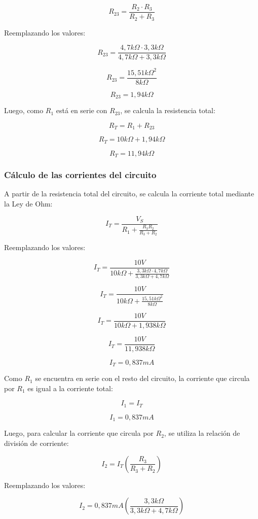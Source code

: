 \documentclass[a4paper,12pt]{article}
\begin{document}
	\[
	R_{23} = \frac{R_2 \cdot R_3}{R_2 + R_3}
	\]
	
	Reemplazando los valores:
	
	\[
	R_{23} =
	\frac{4,7k\Omega \cdot 3,3k\Omega}{4,7k\Omega + 3,3k\Omega}
	\]
	
	\[
	R_{23} =
	\frac{15,51k\Omega^2}{8k\Omega}
	\]
	
	\[
	R_{23} = 1,94k\Omega
	\]
	
	Luego, como $R_1$ está en serie con $R_{23}$, se calcula la resistencia total:
	
	\[
	R_T = R_1 + R_{23}
	\]
	
	\[
	R_T = 10k\Omega + 1,94k\Omega
	\]
	
	\[
	R_T = 11,94k\Omega
	\]
	
	
	\subsubsection*{Cálculo de las corrientes del circuito}
	
	A partir de la resistencia total del circuito, se calcula la corriente total mediante la Ley de Ohm:
	
	\[
	I_T =
	\frac{V_S}
	{R_1 + \frac{R_3 R_2}{R_3 + R_2}}
	\]
	
	Reemplazando los valores:
	
	\[
	I_T =
	\frac{10V}
	{10k\Omega + \frac{3,3k\Omega \cdot 4,7k\Omega}{3,3k\Omega + 4,7k\Omega}}
	\]
	
	\[
	I_T =
	\frac{10V}
	{10k\Omega + \frac{15,51k\Omega^2}{8k\Omega}}
	\]
	
	\[
	I_T =
	\frac{10V}{10k\Omega + 1,938k\Omega}
	\]
	
	\[
	I_T =
	\frac{10V}{11,938k\Omega}
	\]
	
	\[
	I_T = 0,837mA
	\]
	
	Como $R_1$ se encuentra en serie con el resto del circuito, la corriente que circula por $R_1$ es igual
	a la corriente total:
	
	\[
	I_1 = I_T
	\]
	
	\[
	I_1 = 0,837mA
	\]
	
	Luego, para calcular la corriente que circula por $R_2$, se utiliza la relación de división de corriente:
	
	\[
	I_2 = I_T \left(\frac{R_3}{R_3 + R_2}\right)
	\]
	
	Reemplazando los valores:
	
	\[
	I_2 =
	0,837mA
	\left(
	\frac{3,3k\Omega}{3,3k\Omega + 4,7k\Omega}
	\right)
	\]
	
\end{document}
